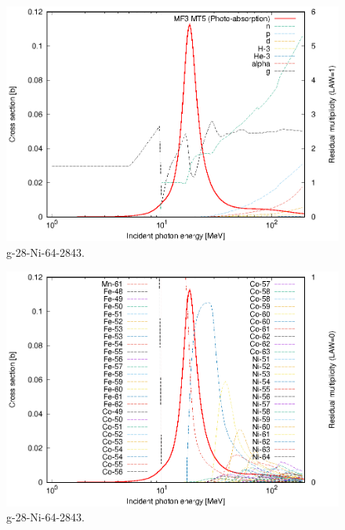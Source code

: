 \begin{figure}
 \includegraphics[width=\linewidth]{eps/g_28-Ni-64_2843.eps}
  \caption{g-28-Ni-64-2843.}
\end{figure}
\begin{figure}
 \includegraphics[width=\linewidth]{eps-law0/g_28-Ni-64_2843.eps}
 \caption{g-28-Ni-64-2843.}
\end{figure}
\newpage \clearpage

